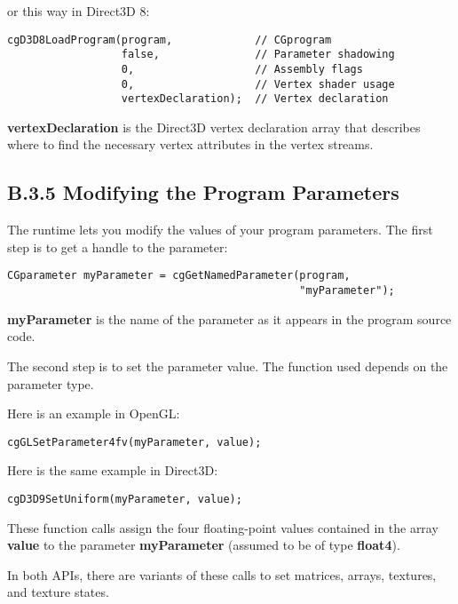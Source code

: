 \documentclass[../main.tex]{subfiles}
\begin{document}
or this way in Direct3D 8:

\FloatBarrier
\begin{lstlisting}
cgD3D8LoadProgram(program,             // CGprogram
                  false,               // Parameter shadowing
                  0,                   // Assembly flags
                  0,                   // Vertex shader usage
                  vertexDeclaration);  // Vertex declaration
\end{lstlisting}
\FloatBarrier

\textbf{vertexDeclaration} is the Direct3D vertex declaration array that describes where to find the necessary vertex attributes in the vertex streams.

\subsection{B.3.5 Modifying the Program Parameters}

The runtime lets you modify the values of your program parameters. The first step is to get a handle to the parameter:

\FloatBarrier
\begin{lstlisting}
CGparameter myParameter = cgGetNamedParameter(program,
                                              "myParameter");
\end{lstlisting}
\FloatBarrier

\textbf{myParameter} is the name of the parameter as it appears in the program source code.

The second step is to set the parameter value. The function used depends on the parameter type.

Here is an example in OpenGL:

\FloatBarrier
\begin{lstlisting}
cgGLSetParameter4fv(myParameter, value);
\end{lstlisting}
\FloatBarrier

Here is the same example in Direct3D:

\FloatBarrier
\begin{lstlisting}
cgD3D9SetUniform(myParameter, value);
\end{lstlisting}
\FloatBarrier

These function calls assign the four floating-point values contained in the array \textbf{value} to the parameter \textbf{myParameter} (assumed to be of type \textbf{float4}).

In both APIs, there are variants of these calls to set matrices, arrays, textures, and texture states.
\end{document}
